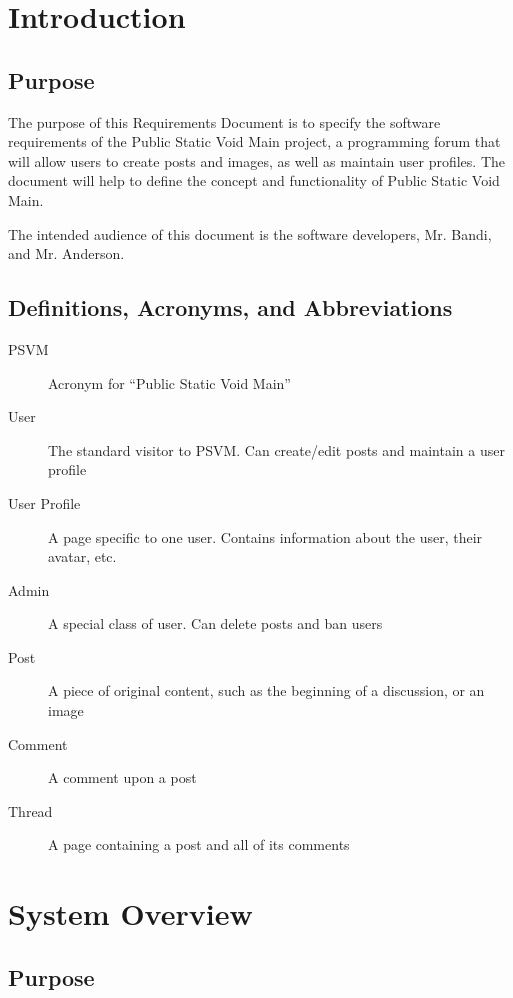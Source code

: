 \documentclass[12pt]{scrartcl}
\begin{document}


\newpage\null\thispagestyle{empty}\newpage

\tableofcontents

\newpage\null\thispagestyle{empty}\newpage

\section{Introduction}
\subsection{Purpose}
The purpose of this Requirements Document is to specify the software requirements of the Public Static Void Main project, a programming forum that will allow users to create posts and images, as well as maintain user profiles. The document will help to define the concept and functionality of Public Static Void Main.
 
The intended audience of this document is the software developers, Mr. Bandi, and Mr. Anderson.
 
\subsection{Definitions, Acronyms, and Abbreviations}
\begin{description}
\item [PSVM]          	Acronym for “Public Static Void Main”
\item [User]            The standard visitor to PSVM. Can create/edit posts and maintain a user profile
\item [User Profile] 	A page specific to one user. Contains information about the user, their avatar, etc.
\item [Admin]         	A special class of user. Can delete posts and ban users
\item [Post]            A piece of original content, such as the beginning of a discussion, or an image
\item [Comment]			A comment upon a post
\item [Thread]			A page containing a post and all of its comments
\end{description}
\section{System Overview}
\subsection{Purpose}
\end{document}
